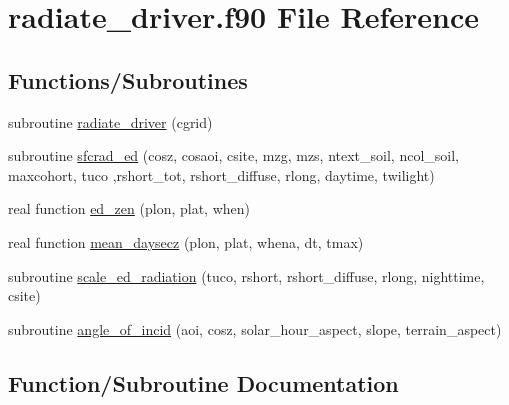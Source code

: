\hypertarget{radiate__driver_8f90}{}\section{radiate\+\_\+driver.\+f90 File Reference}
\label{radiate__driver_8f90}
\subsection*{Functions/\+Subroutines}
\begin{DoxyCompactItemize}
\item 
subroutine \hyperlink{radiate__driver_8f90_ab00f8ed30131a8759492cb10c7bdb13a}{radiate\+\_\+driver} (cgrid)
\item 
subroutine \hyperlink{radiate__driver_8f90_aa7642a6b7c3a9578373f6f05492956ec}{sfcrad\+\_\+ed} (cosz, cosaoi, csite, mzg, mzs, ntext\+\_\+soil, ncol\+\_\+soil, maxcohort, tuco                                                                                                           ,rshort\+\_\+tot, rshort\+\_\+diffuse, rlong, daytime, twilight)
\item 
real function \hyperlink{radiate__driver_8f90_a2a40f6616130a988dc00df00fd848de5}{ed\+\_\+zen} (plon, plat, when)
\item 
real function \hyperlink{radiate__driver_8f90_a43ec6176af1ff5ea603858cec577ff95}{mean\+\_\+daysecz} (plon, plat, whena, dt, tmax)
\item 
subroutine \hyperlink{radiate__driver_8f90_a20652a9e1fed5b3bf4eabdf48c924058}{scale\+\_\+ed\+\_\+radiation} (tuco, rshort, rshort\+\_\+diffuse, rlong, nighttime, csite)
\item 
subroutine \hyperlink{radiate__driver_8f90_a173664babf281d82aa440bf111ad9d2a}{angle\+\_\+of\+\_\+incid} (aoi, cosz, solar\+\_\+hour\+\_\+aspect, slope, terrain\+\_\+aspect)
\end{DoxyCompactItemize}


\subsection{Function/\+Subroutine Documentation}
